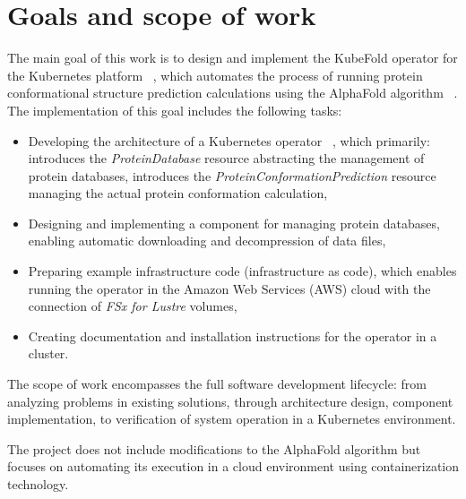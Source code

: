 \section{Goals and scope of work}

The main goal of this work is to design and implement the KubeFold operator for the Kubernetes platform ~\cite{kubernetes}, which automates the process of running protein conformational structure prediction calculations using the AlphaFold algorithm ~\cite{alphafold3}.
The implementation of this goal includes the following tasks:

\begin{itemize}
    \item Developing the architecture of a Kubernetes operator ~\cite{k8s_operators}, which primarily:
    \subitem introduces the \textit{ProteinDatabase} resource abstracting the management of protein databases,
    \subitem introduces the \textit{ProteinConformationPrediction} resource managing the actual protein conformation calculation,
    \item Designing and implementing a component for managing protein databases, enabling automatic downloading and decompression of data files,
    \item Preparing example infrastructure code (infrastructure as code), which enables running the operator in the Amazon Web Services (AWS) cloud with the connection of \textit{FSx for Lustre} volumes,
    \item Creating documentation and installation instructions for the operator in a cluster.
\end{itemize}

The scope of work encompasses the full software development lifecycle: from analyzing problems in existing solutions, through architecture design, component implementation, to verification of system operation in a Kubernetes environment.

The project does not include modifications to the AlphaFold algorithm but focuses on automating its execution in a cloud environment using containerization technology.

